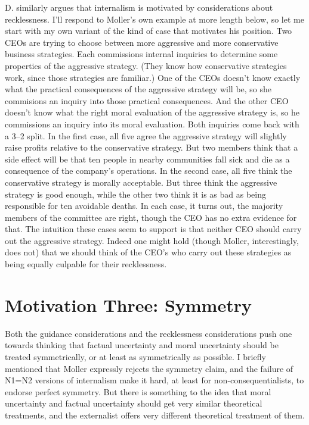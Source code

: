 D. \citet{Moller2011} similarly argues that internalism is motivated by considerations about recklessness. I'll respond to Moller's own example at more length below, so let me start with my own variant of the kind of case that motivates his position. Two CEOs are trying to choose between more aggressive and more conservative business strategies. Each commissions internal inquiries to determine some properties of the aggressive strategy. (They know how conservative strategies work, since those strategies are familiar.) One of the CEOs doesn't know exactly what the practical consequences of the aggressive strategy will be, so she commisions an inquiry into those practical consequences. And the other CEO doesn't know what the right moral evaluation of the aggressive strategy is, so he commissions an inquiry into its moral evaluation. Both inquiries come back with a 3--2 split. In the first case, all five agree the aggressive strategy will slightly raise profits relative to the conservative strategy. But two members think that a side effect will be that ten people in nearby communities fall sick and die as a consequence of the company's operations. In the second case, all five think the conservative strategy is morally acceptable. But three think the aggressive strategy is good enough, while the other two think it is as bad as being responsible for ten avoidable deaths. In each case, it turns out, the majority members of the committee are right, though the CEO has no extra evidence for that. The intuition these cases seem to support is that neither CEO should carry out the aggressive strategy. Indeed one might hold (though Moller, interestingly, does not) that we should think of the CEO's who carry out these strategies as being equally culpable for their recklessness.

\section{Motivation Three: Symmetry}
\label{motivationthree:symmetry}

Both the guidance considerations and the recklessness considerations push one towards thinking that factual uncertainty and moral uncertainty should be treated symmetrically, or at least as symmetrically as possible. I briefly mentioned that Moller expressly rejects the symmetry claim, and the failure of N1=N2 versions of internalism make it hard, at least for non-consequentialists, to endorse perfect symmetry. But there is something to the idea that moral uncertainty and factual uncertainty should get very similar theoretical treatments, and the externalist offers very different theoretical treatment of them.

